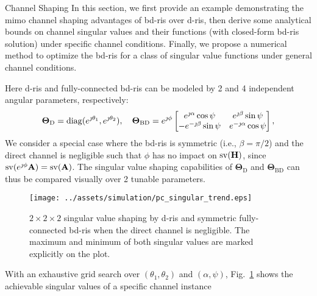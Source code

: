 \documentclass[journal]{IEEEtran}
\begin{document}
\begin{section}{Channel Shaping}
	In this section, we first provide an example demonstrating the \gls{mimo} channel shaping advantages of \gls{bd}-\gls{ris} over \gls{d}-\gls{ris}, then derive some analytical bounds on channel singular values and their functions (with closed-form \gls{bd}-\gls{ris} solution) under specific channel conditions.
	Finally, we propose a numerical method to optimize the \gls{bd}-\gls{ris} for a class of singular value functions under general channel conditions.

	\begin{example}
		\label{eg:shaping_potential}
		Here \gls{d}-\gls{ris} and fully-connected \gls{bd}-\gls{ris} can be modeled by 2 and 4 independent angular parameters, respectively:
		\begin{equation*}
			\mathbf{\Theta}_\mathrm{D} = \operatorname{diag}(e^{\jmath \theta_1}, e^{\jmath \theta_2}), \quad
			\mathbf{\Theta}_\mathrm{BD} = e^{\jmath \phi} \begin{bmatrix}
				e^{\jmath \alpha} \cos \psi  & e^{\jmath \beta} \sin \psi   \\
				-e^{-\jmath \beta} \sin \psi & e^{-\jmath \alpha} \cos \psi
			\end{bmatrix},
		\end{equation*}
		We consider a special case where the \gls{bd}-\gls{ris} is symmetric (i.e., $\beta = \pi / 2$) and the direct channel is negligible such that $\phi$ has no impact on $\operatorname{sv}(\mathbf{H})$, since $\operatorname{sv}(e^{\jmath \phi} \mathbf{A}) = \operatorname{sv}(\mathbf{A})$.
		The singular value shaping capabilities of $\mathbf{\Theta}_\mathrm{D}$ and $\mathbf{\Theta}_\mathrm{BD}$ can thus be compared visually over 2 tunable parameters.
		\begin{figure}
			\centering
			\texttt{[image: ../assets/simulation/pc\_singular\_trend.eps]}
			\caption{$2 \times 2 \times 2$ singular value shaping by \gls{d}-\gls{ris} and symmetric fully-connected \gls{bd}-\gls{ris} when the direct channel is negligible.
			The maximum and minimum of both singular values are marked explicitly on the plot.}
			\label{fg:shaping_potential}
		\end{figure}
		With an exhaustive grid search over $(\theta_1, \theta_2)$ and $(\alpha, \psi)$, Fig.~\ref{fg:shaping_potential} shows the achievable singular values of a specific channel instance

\end{example}
\end{section}
\end{document}
